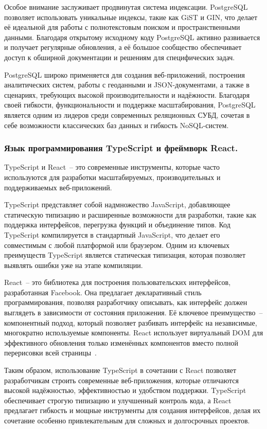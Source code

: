 Особое внимание заслуживает продвинутая система индексации. PostgreSQL позволяет использовать уникальные индексы, такие как GiST и GIN, что делает её идеальной для работы с полнотекстовым поиском и пространственными данными. Благодаря открытому исходному коду PostgreSQL активно развивается и получает регулярные обновления, а её большое сообщество обеспечивает доступ к обширной документации и решениям для специфических задач.

PostgreSQL широко применяется для создания веб-приложений, построения аналитических систем, работы с геоданными и JSON-документами, а также в сценариях, требующих высокой производительности и надёжности. Благодаря своей гибкости, функциональности и поддержке масштабирования, PostgreSQL является одним из лидеров среди современных реляционных СУБД, сочетая в себе возможности классических баз данных и гибкость NoSQL-систем.

\subsubsection{Язык программирования TypeScript и фреймворк React. }

TypeScript и React~-- это современные инструменты, которые часто используются для разработки масштабируемых, производительных и поддерживаемых веб-приложений.

TypeScript представляет собой надмножество JavaScript, добавляющее статическую типизацию и расширенные возможности для разработки, такие как поддержка интерфейсов, перегрузка функций и объединение типов. Код TypeScript компилируется в стандартный JavaScript, что делает его совместимым с любой платформой или браузером. Одним из ключевых преимуществ TypeScript является статическая типизация, которая позволяет выявлять ошибки уже на этапе компиляции.

React~-- это библиотека для построения пользовательских интерфейсов, разработанная Facebook. Она предлагает декларативный стиль программирования, позволяя разработчику описывать, как интерфейс должен выглядеть в зависимости от состояния приложения. Её ключевое преимущество~-- компонентный подход, который позволяет разбивать интерфейс на независимые, многократно используемые компоненты. React использует виртуальный DOM для эффективного обновления только изменённых компонентов вместо полной перерисовки всей страницы~\cite{book_react}.

Таким образом, использование TypeScript в сочетании с React позволяет разработчикам строить современные веб-приложения, которые отличаются высокой надёжностью, эффективностью и удобством поддержки. TypeScript обеспечивает строгую типизацию и улучшенный контроль кода, а React предлагает гибкость и мощные инструменты для создания интерфейсов, делая их сочетание особенно привлекательным для сложных и долгосрочных проектов.

